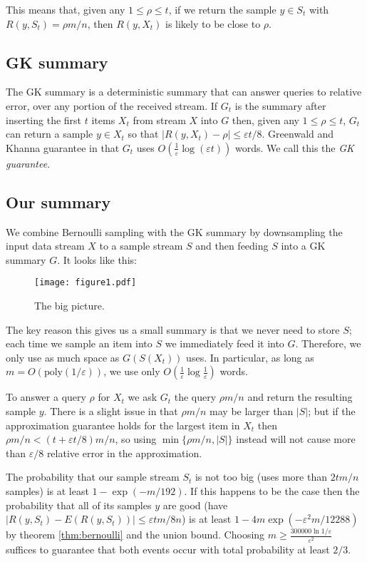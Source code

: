 \documentclass{article}
\theoremstyle{plain}
\def\ep{\varepsilon}
\def\pl{\!+\!}
\newcommand{\p}[1]{(#1)}
\newcommand{\pc}[1]{\{#1\}}
\newcommand{\abs}[1]{|#1|}
\newcommand{\expp}[1]{\exp\p{#1}}
\newcommand{\logp}[1]{\log\p{#1}}
\newcommand{\E}[1]{E\p{#1}}
\newcommand{\OO}[1]{O\p{#1}}
\newcommand{\poly}[1]{\text{poly}\p{#1}}
\newcommand{\rank}[2]{R\p{#1,#2}}
\begin{document}
This means that, given any $1 \le \rho \le t$, if we return the sample $y \in
S_t$ with $\rank{y}{S_t} = \rho m / n$, then $\rank{y}{X_t}$ is likely to be
close to $\rho$.



\subsection{GK summary}

The GK summary is a deterministic summary that can answer queries to relative
error, over any portion of the received stream. If $G_t$ is the summary after
inserting the first $t$ items $X_t$ from stream $X$ into $G$ then, given any $1
\le \rho \le t$, $G_t$ can return a sample $y \in X_t$ so that
$\abs{\rank{y}{X_t} - \rho} \le \ep t / 8$. Greenwald and Khanna guarantee in
\cite{GK2001} that $G_t$ uses $\OO{\frac{1}{\ep} \logp{\ep t}}$ words. We call
this the \emph{GK guarantee}.



\subsection{Our summary}

We combine Bernoulli sampling with the GK summary by downsampling the input data
stream $X$ to a sample stream $S$ and then feeding $S$ into a GK summary $G$. It
looks like this:

\begin{figure}[H]
  \texttt{[image: figure1.pdf]}
  \centering
  \caption{The big picture.}
  \label{fig:figure1}
\end{figure}

The key reason this gives us a small summary is that we never need to store $S$;
each time we sample an item into $S$ we immediately feed it into $G$. Therefore,
we only use as much space as $G\p{S\p{X_t}}$ uses. In particular, as long as $m
= \OO{\poly{1/\ep}}$, we use only $\OO{\frac{1}{\ep} \log \frac{1}{\ep}}$ words.

To answer a query $\rho$ for $X_t$ we ask $G_t$ the query $\rho m / n$ and
return the resulting sample $y$. There is a slight issue in that $\rho m / n$
may be larger than $\abs{S}$; but if the approximation guarantee holds for the
largest item in $X_t$ then $\rho m / n < \p{t \pl \ep t/8} m / n$, so using
$\min\pc{\rho m / n, \abs{S}}$ instead will not cause more than $\ep/8$ relative
error in the approximation.

The probability that our sample stream $S_t$ is not too big (uses more than $2 t
m / n$ samples) is at least $1 - \expp{-m/192}$. If this happens to be the case
then the probability that all of its samples $y$ are good (have
$\abs{\rank{y}{S_t} - \E{\rank{y}{S_t}}} \le \ep t m / 8 n$) is at least $1 - 4
m \expp{- \ep^2 m / 12288}$ by theorem \ref{thm:bernoulli} and the union bound.
Choosing $m \ge \frac{300000 \ln 1/\ep}{\ep^2}$ suffices to guarantee that both
events occur with total probability at least $2/3$.
\end{document}
